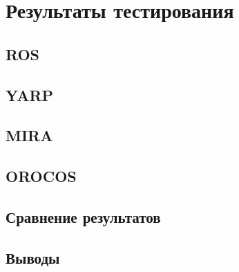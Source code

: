 \chapter{Результаты тестирования}
\section{ROS}
\section{YARP}
\section{MIRA}
\section{OROCOS}
\section{Сравнение результатов}
\section{Выводы}
